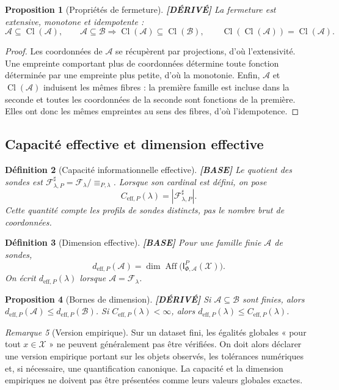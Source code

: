 \documentclass[11pt,a4paper]{article}
\newtheorem{definition}{Définition}[section]
\newtheorem{proposition}[definition]{Proposition}
\theoremstyle{remark}
\newtheorem{remark}[definition]{Remarque}
\newcommand{\X}{\mathcal X}
\newcommand{\F}{\mathcal F}
\newcommand{\Cl}{\operatorname{Cl}}
\newcommand{\Aff}{\operatorname{Aff}}
\newcommand{\Emp}{\mathsf I}
\begin{document}
\begin{proposition}[Propriétés de fermeture] \textbf{[DÉRIVÉ]}
La fermeture est extensive, monotone et idempotente :
\[
\mathcal A\subseteq\Cl(\mathcal A),\qquad
\mathcal A\subseteq\mathcal B\Rightarrow\Cl(\mathcal A)\subseteq\Cl(\mathcal B),\qquad
\Cl(\Cl(\mathcal A))=\Cl(\mathcal A).
\]
\end{proposition}
\begin{proof}
Les coordonnées de $\mathcal A$ se récupèrent par projections, d'où l'extensivité. Une empreinte comportant plus de coordonnées détermine toute fonction déterminée par une empreinte plus petite, d'où la monotonie. Enfin, $\mathcal A$ et $\Cl(\mathcal A)$ induisent les mêmes fibres : la première famille est incluse dans la seconde et toutes les coordonnées de la seconde sont fonctions de la première. Elles ont donc les mêmes empreintes au sens des fibres, d'où l'idempotence.
\end{proof}

\subsection{Capacité effective et dimension effective}
\begin{definition}[Capacité informationnelle effective] \textbf{[BASE]}
Le quotient des sondes est $\F_{\lambda,P}^{\sharp}=\F_\lambda/\!\equiv_{P,\lambda}$. Lorsque son cardinal est défini, on pose
\[
\boxed{C_{\mathrm{eff},P}(\lambda)=|\F_{\lambda,P}^{\sharp}|.}
\]
Cette quantité compte les profils de sondes distincts, pas le nombre brut de coordonnées.
\end{definition}

\begin{definition}[Dimension effective] \textbf{[BASE]}
Pour une famille finie $\mathcal A$ de sondes,
\[
\boxed{d_{\mathrm{eff},P}(\mathcal A)=\dim\Aff\big(\Emp_{\Phi,\mathcal A}^P(\X)\big).}
\]
On écrit $d_{\mathrm{eff},P}(\lambda)$ lorsque $\mathcal A=\F_\lambda$.
\end{definition}

\begin{proposition}[Bornes de dimension] \textbf{[DÉRIVÉ]}
Si $\mathcal A\subseteq\mathcal B$ sont finies, alors $d_{\mathrm{eff},P}(\mathcal A)\leq d_{\mathrm{eff},P}(\mathcal B)$. Si $C_{\mathrm{eff},P}(\lambda)<\infty$, alors $d_{\mathrm{eff},P}(\lambda)\leq C_{\mathrm{eff},P}(\lambda)$.
\end{proposition}

\begin{remark}[Version empirique]
Sur un dataset fini, les égalités globales « pour tout $x\in\X$ » ne peuvent généralement pas être vérifiées. On doit alors déclarer une version empirique portant sur les objets observés, les tolérances numériques et, si nécessaire, une quantification canonique. La capacité et la dimension empiriques ne doivent pas être présentées comme leurs valeurs globales exactes.
\end{remark}
\end{document}
